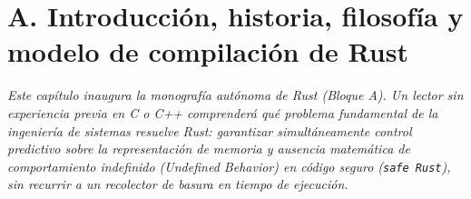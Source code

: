 \documentclass{book}
\begin{document}
\chapter{A. Introducción, historia, filosofía y modelo de compilación de Rust}
\label{chap:cap01-introduccion-historia-modelo-compilacion-rust}

\noindent\textit{Este capítulo inaugura la monografía autónoma de Rust (Bloque A). Un lector sin experiencia previa en C o C++ comprenderá qué problema fundamental de la ingeniería de sistemas resuelve Rust: garantizar simultáneamente control predictivo sobre la representación de memoria y ausencia matemática de comportamiento indefinido (Undefined Behavior) en código seguro (\texttt{safe Rust}), sin recurrir a un recolector de basura en tiempo de ejecución.}
\end{document}
